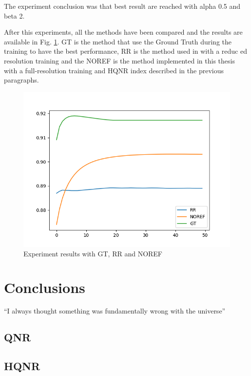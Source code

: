 \documentclass[12pt]{report}
\begin{document}
The experiment conclusion was that best result are reached with alpha 0.5 and beta 2.

After this experiments, all the methods have been compared and the results are available in Fig. \ref{fig:gt_rr_noref}.
GT is the method that use the Ground Truth during the training to have the best performance,
RR is the method used in \cite{pnn} with a reduc        ed resolution training and the NOREF is the method
implemented in this thesis with a full-resolution training and HQNR index described in the previous paragraphs. 

\begin{figure}[t]
    \centering
    \includegraphics[scale=.6]{toulouse_gt_rr_noref.png}
    \caption{Experiment results with GT, RR and NOREF}
    \label{fig:gt_rr_noref}
\end{figure}


\chapter*{Conclusions}
``I always thought something was fundamentally wrong with the universe'' \cite{criticalComparison}
\newpage




\newpage

\appendix

\begin{spacing}{1}
\section{QNR}
\label{qnr_functions}


\section{HQNR}
\label{hqnr_functions}

\end{spacing}
\end{document}
